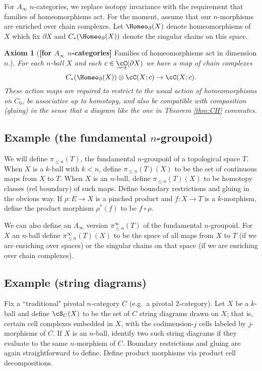 \documentclass{pnastwo}
\newcommand{\cl}[1]{\underrightarrow{#1}}
\newcommand{\tensor}{\otimes}
\def\bd{\partial}
\newtheorem{axiom}[prop]{Axiom}
\begin{document}
\begin{article}
\smallskip

For $A_\infty$ $n$-categories, we replace
isotopy invariance with the requirement that families of homeomorphisms act.
For the moment, assume that our $n$-morphisms are enriched over chain complexes.
Let $\Homeo_\bd(X)$ denote homeomorphisms of $X$ which fix $\bd X$ and
$C_*(\Homeo_\bd(X))$ denote the singular chains on this space.


\begin{axiom}[\textup{\textbf{[for $A_\infty$ $n$-categories]}} Families of homeomorphisms act in dimension $n$.]
\label{axiom:families}
For each $n$-ball $X$ and each $c\in \cl{\cC}(\bd X)$ we have a map of chain complexes
\[
	C_*(\Homeo_\bd(X))\tensor \cC(X; c) \to \cC(X; c) .
\]
These action maps are required to restrict to the usual action of homeomorphisms on $C_0$, be associative up to homotopy,
and also be compatible with composition (gluing) in the sense that
a diagram like the one in Theorem \ref{thm:CH} commutes.
\end{axiom}

\subsection{Example (the fundamental $n$-groupoid)} \mbox{}
We will define $\pi_{\le n}(T)$, the fundamental $n$-groupoid of a topological space $T$.
When $X$ is a $k$-ball with $k<n$, define $\pi_{\le n}(T)(X)$
to be the set of continuous maps from $X$ to $T$.
When $X$ is an $n$-ball, define $\pi_{\le n}(T)(X)$ to be homotopy classes (rel boundary) of such maps.
Define boundary restrictions and gluing in the obvious way.
If $\rho:E\to X$ is a pinched product and $f:X\to T$ is a $k$-morphism,
define the product morphism $\rho^*(f)$ to be $f\circ\rho$.

We can also define an $A_\infty$ version $\pi_{\le n}^\infty(T)$ of the fundamental $n$-groupoid.
For $X$ an $n$-ball define $\pi_{\le n}^\infty(T)(X)$ to be the space of all maps from $X$ to $T$
(if we are enriching over spaces) or the singular chains on that space (if we are enriching over chain complexes).


\subsection{Example (string diagrams)} \mbox{}
Fix a ``traditional" pivotal $n$-category $C$ (e.g.\ a pivotal 2-category).
Let $X$ be a $k$-ball and define $\cS_C(X)$ to be the set of $C$ string diagrams drawn on $X$;
that is, certain cell complexes embedded in $X$, with the codimension-$j$ cells labeled by $j$-morphisms of $C$.
If $X$ is an $n$-ball, identify two such string diagrams if they evaluate to the same $n$-morphism of $C$.
Boundary restrictions and gluing are again straightforward to define.
Define product morphisms via product cell decompositions.


\end{article}
\end{document}
